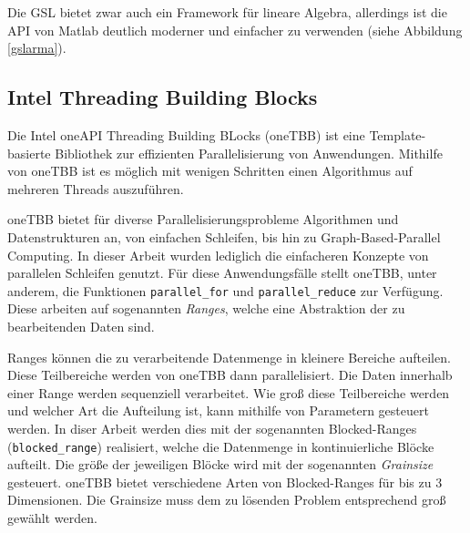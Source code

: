 Die GSL bietet zwar auch ein Framework für lineare Algebra, allerdings ist die API von Matlab deutlich moderner und einfacher zu verwenden (siehe Abbildung \ref{gslarma}).





\subsection{Intel Threading Building Blocks}


Die Intel\textsuperscript{\textcopyright} oneAPI Threading Building BLocks (oneTBB) ist eine Template-basierte Bibliothek zur effizienten Parallelisierung von Anwendungen. 
Mithilfe von oneTBB ist es möglich mit wenigen Schritten einen Algorithmus auf mehreren Threads auszuführen.

oneTBB bietet für diverse Parallelisierungsprobleme  Algorithmen und Datenstrukturen an, von einfachen Schleifen, bis hin zu Graph-Based-Parallel Computing.
In dieser Arbeit wurden lediglich die einfacheren Konzepte von parallelen Schleifen genutzt. Für diese Anwendungsfälle stellt oneTBB, unter anderem, die Funktionen \texttt{parallel\_for} und \texttt{parallel\_reduce}
zur Verfügung. Diese arbeiten auf sogenannten \textit{Ranges}, welche eine Abstraktion der zu bearbeitenden Daten sind.

Ranges können die zu verarbeitende Datenmenge in kleinere Bereiche aufteilen. Diese Teilbereiche werden von oneTBB dann parallelisiert. Die Daten innerhalb einer Range werden sequenziell verarbeitet. 
Wie groß diese Teilbereiche werden und welcher Art die Aufteilung ist, kann mithilfe von Parametern gesteuert werden. In diser Arbeit werden dies mit der sogenannten Blocked-Ranges (\texttt{blocked\_range}) realisiert, welche die Datenmenge in kontinuierliche Blöcke aufteilt. Die größe der jeweiligen Blöcke wird mit der sogenannten \textit{Grainsize} gesteuert.
oneTBB bietet verschiedene Arten von Blocked-Ranges für bis zu 3 Dimensionen. Die Grainsize muss dem zu lösenden Problem entsprechend groß gewählt werden.

